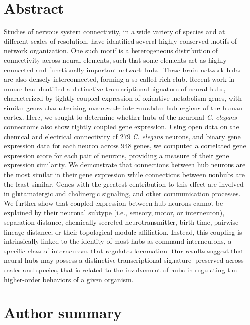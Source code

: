 \section*{Abstract}
Studies of nervous system connectivity, in a wide variety of species and at different scales of resolution, have identified several highly conserved motifs of network organization.
One such motif is a heterogeneous distribution of connectivity across neural elements, such that some elements act as highly connected and functionally important network hubs.
These brain network hubs are also densely interconnected, forming a so-called rich club.
Recent work in mouse has identified a distinctive transcriptional signature of neural hubs, characterized by tightly coupled expression of oxidative metabolism genes, with similar genes characterizing macroscale inter-modular hub regions of the human cortex.
Here, we sought to determine whether hubs of the neuronal \textit{C. elegans} connectome also show tightly coupled gene expression.
Using open data on the chemical and electrical connectivity of $279$ \textit{C. elegans} neurons, and binary gene expression data for each neuron across $948$ genes, we computed a correlated gene expression score for each pair of neurons, providing a measure of their gene expression similarity.
We demonstrate that connections between hub neurons are the most similar in their gene expression while connections between nonhubs are the least similar.
Genes with the greatest contribution to this effect are involved in glutamatergic and cholinergic signaling, and other communication processes.
We further show that coupled expression between hub neurons cannot be explained by their neuronal subtype (i.e., sensory, motor, or interneuron), separation distance, chemically secreted neurotransmitter, birth time, pairwise lineage distance, or their topological module affiliation.
Instead, this coupling is intrinsically linked to the identity of most hubs as command interneurons, a specific class of interneurons that regulates locomotion.
Our results suggest that neural hubs may possess a distinctive transcriptional signature, preserved across scales and species, that is related to the involvement of hubs in regulating the higher-order behaviors of a given organism.

\section*{Author summary}

